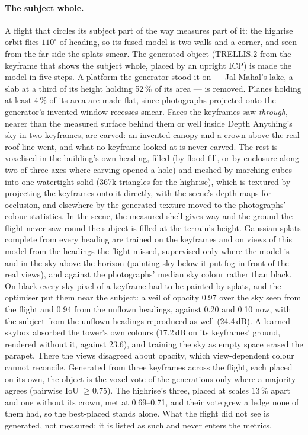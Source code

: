 \documentclass[10pt,a4paper,twocolumn]{article}
\begin{document}
\paragraph{The subject whole.} A flight that circles its subject part of the way measures part of it: the highrise orbit flies $110^\circ$ of heading, so its fused model is two walls and a corner, and seen from the far side the splats smear. The generated object (TRELLIS.2 from the keyframe that shows the subject whole, placed by an upright ICP) is made the model in five steps. A platform the generator stood it on --- Jal Mahal's lake, a slab at a third of its height holding 52\,\% of its area --- is removed. Planes holding at least 4\,\% of its area are made flat, since photographs projected onto the generator's invented window recesses smear. Faces the keyframes saw \emph{through}, nearer than the measured surface behind them or well inside Depth Anything's sky in two keyframes, are carved: an invented canopy and a crown above the real roof line went, and what no keyframe looked at is never carved. The rest is voxelised in the building's own heading, filled (by flood fill, or by enclosure along two of three axes where carving opened a hole) and meshed by marching cubes into one watertight solid (367k triangles for the highrise), which is textured by projecting the keyframes onto it directly, with the scene's depth maps for occlusion, and elsewhere by the generated texture moved to the photographs' colour statistics. In the scene, the measured shell gives way and the ground the flight never saw round the subject is filled at the terrain's height. Gaussian splats complete from every heading are trained on the keyframes and on views of this model from the headings the flight missed, supervised only where the model is and in the sky above the horizon (painting sky below it put fog in front of the real views), and against the photographs' median sky colour rather than black. On black every sky pixel of a keyframe had to be painted by splats, and the optimiser put them near the subject: a veil of opacity 0.97 over the sky seen from the flight and 0.94 from the unflown headings, against 0.20 and 0.10 now, with the subject from the unflown headings reproduced as well (24.4\,dB). A learned skybox absorbed the tower's own colours (17.2\,dB on its keyframes' ground, rendered without it, against 23.6), and training the sky as empty space erased the parapet. There the views disagreed about opacity, which view-dependent colour cannot reconcile. Generated from three keyframes across the flight, each placed on its own, the object is the voxel vote of the generations only where a majority agrees (pairwise IoU $\geq 0.75$). The highrise's three, placed at scales 13\,\% apart and one without its crown, met at 0.69--0.71, and their vote grew a ledge none of them had, so the best-placed stands alone. What the flight did not see is generated, not measured; it is listed as such and never enters the metrics.
\end{document}
